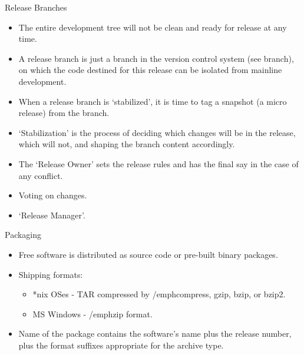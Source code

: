\documentclass{beamer}
\begin{document}
\begin{frame}{Release Branches}
\begin{itemize}
	\item The entire development tree will not be clean and ready for release at any time. 
	\item A release branch is just a branch in the version control system (see branch), on which the code destined for this release can be isolated from mainline 	development. 
	\item When a release branch is `stabilized', it is time to tag a snapshot (a micro release) from the branch. 
	\item `Stabilization' is the process of deciding which changes will be in the release, which will not, and shaping the branch content accordingly. 
	\item The `Release Owner' sets the release rules and has the final say in the case of any conflict.
	\item Voting on changes. 
	\item `Release Manager'.
\end{itemize}
\end{frame}

\begin{frame}{Packaging}
\begin{itemize}
	\item Free software is distributed as source code or pre-built binary packages.
	\item Shipping formats:
	\begin{itemize}
		\item *nix OSes - TAR compressed by /emph{compress, gzip, bzip, or bzip2}. 
		\item MS Windows - /emph{zip} format. 
	\end{itemize}
	\item Name of the package contains the software's name plus the release number, plus the format suffixes appropriate for the archive type.
\end{itemize}
\end{frame}
\end{document}
